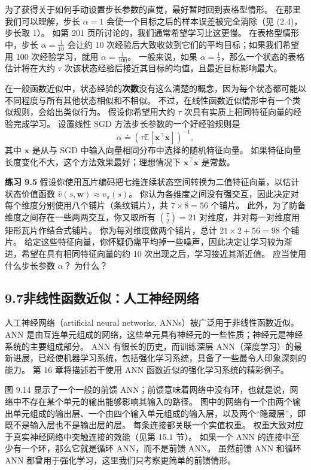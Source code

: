 \documentclass[UTF8, 12pt, fontset=fandol, oneside]{ctexart}
\begin{document}
为了获得关于如何手动设置步长参数的直觉，最好暂时回到表格型情形。
在那里我们可以理解，步长 $\alpha=1$ 会使一个目标之后的样本误差被完全消除（见 (2.4)，步长取 1）。
如第 201 页所讨论的，我们通常希望学习比这更慢。
在表格型情形中，步长 $\alpha=\frac{1}{10}$ 会让约 10 次经验后大致收敛到它们的平均目标；如果我们希望用 100 次经验学习，就用 $\alpha=\frac{1}{100}$。
一般来说，如果 $\alpha=\frac{1}{\tau}$，那么一个状态的表格估计将在大约 $\tau$ 次该状态经验后接近其目标的均值，且最近目标影响最大。

在一般函数近似中，状态经验的\textbf{次数}没有这么清楚的概念，因为每个状态都可能以不同程度与所有其他状态相似和不相似。
不过，在线性函数近似情形中有一个类似规则，会给出类似行为。
假设你希望用大约 $\tau$ 次具有实质上相同特征向量的经验完成学习。
设置线性 SGD 方法步长参数的一个好经验规则是
\begin{equation}
\alpha\doteq \left(\tau\mathbb{E}[\mathbf{x}^\top\mathbf{x}]\right)^{-1},
\tag{9.19}
\end{equation}
其中 $\mathbf{x}$ 是从与 SGD 中输入向量相同分布中选择的随机特征向量。
如果特征向量长度变化不大，这个方法效果最好；理想情况下 $\mathbf{x}^\top\mathbf{x}$ 是常数。

\noindent\textbf{练习 9.5}
假设你使用瓦片编码把七维连续状态空间转换为二值特征向量，以估计状态价值函数 $\hat{v}(s,\mathbf{w})\approx v_\pi(s)$。
你认为各维度之间没有强交互，因此决定对每个维度分别使用八个铺片（条纹铺片），共 $7\times8=56$ 个铺片。
此外，为了防备维度之间存在一些两两交互，你又取所有 $\binom{7}{2}=21$ 对维度，并对每一对维度用矩形瓦片作结合式铺片。
你为每对维度做两个铺片，总计 $21\times2+56=98$ 个铺片。
给定这些特征向量，你怀疑仍需平均掉一些噪声，因此决定让学习较为渐进，希望在具有相同特征向量的约 10 次出现之后，学习接近其渐近值。
应当使用什么步长参数 $\alpha$？
为什么？

\subsection*{9.7\quad 非线性函数近似：人工神经网络}

人工神经网络（artificial neural networks, ANNs）被广泛用于非线性函数近似。
ANN 是由互连单元组成的网络，这些单元具有神经元的一些性质；神经元是神经系统的主要组成部分。
ANN 有很长的历史，而训练深层 ANN（深度学习）的最新进展，已经使机器学习系统，包括强化学习系统，具备了一些最令人印象深刻的能力。
第 16 章将描述若干使用 ANN 函数近似的强化学习系统的精彩例子。

图 9.14 显示了一个一般的前馈 ANN；前馈意味着网络中没有环，也就是说，网络中不存在某个单元的输出能够影响其输入的路径。
图中的网络有一个由两个输出单元组成的输出层、一个由四个输入单元组成的输入层，以及两个“隐藏层”，即既不是输入层也不是输出层的层。
每条连接都关联一个实值权重。
权重大致对应于真实神经网络中突触连接的效能（见第 15.1 节）。
如果一个 ANN 的连接中至少有一个环，那么它就是循环 ANN，而不是前馈 ANN。
虽然前馈 ANN 和循环 ANN 都曾用于强化学习，这里我们只考察更简单的前馈情形。
\end{document}
